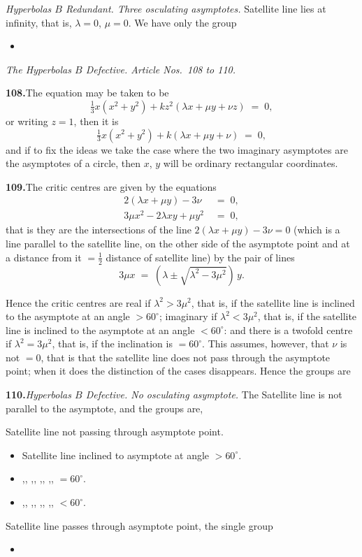 \documentclass[11pt]{article}
\begin{document}
\noindent\emph{Hyperbolas $B$ Redundant. Three osculating asymptotes.} Satellite line lies at infinity, that is, $\lambda = 0$, $\mu = 0$. We have only the group
\begin{itemize}\itemsep0pt
\item[XVII.]
\end{itemize}

\bigskip
\noindent\textit{The Hyperbolas $B$ Defective. Article Nos.~108 to 110.}

\medskip
\textbf{108.}\quad The equation may be taken to be
\[
\tfrac{1}{3} x(x^{2} + y^{2}) + k z^{2}(\lambda x + \mu y + \nu z) \;=\; 0,
\]
or writing $z = 1$, then it is
\[
\tfrac{1}{3} x(x^{2} + y^{2}) + k(\lambda x + \mu y + \nu) \;=\; 0,
\]
and if to fix the ideas we take the case where the two imaginary asymptotes are the asymptotes of a circle, then $x$, $y$ will be ordinary rectangular coordinates.

\medskip
\textbf{109.}\quad The critic centres are given by the equations
\begin{align*}
2(\lambda x + \mu y) - 3 \nu &\;=\; 0,\\
3 \mu x^{2} - 2 \lambda x y + \mu y^{2} &\;=\; 0,
\end{align*}
that is they are the intersections of the line $2(\lambda x + \mu y) - 3 \nu = 0$ (which is a line parallel to the satellite line, on the other side of the asymptote point and at a distance from it $= \tfrac{1}{2}$ distance of satellite line) by the pair of lines
\[
3 \mu x \;=\; (\lambda \pm \sqrt{\lambda^{2} - 3 \mu^{2}})\, y.
\]

Hence the critic centres are real if $\lambda^{2} > 3 \mu^{2}$, that is, if the satellite line is inclined to the asymptote at an angle $> 60^{\circ}$; imaginary if $\lambda^{2} < 3 \mu^{2}$, that is, if the satellite line is inclined to the asymptote at an angle $< 60^{\circ}$: and there is a twofold centre if $\lambda^{2} = 3 \mu^{2}$, that is, if the inclination is $= 60^{\circ}$. This assumes, however, that $\nu$ is not $= 0$, that is that the satellite line does not pass through the asymptote point; when it does the distinction of the cases disappears. Hence the groups are

\medskip
\textbf{110.}\quad \emph{Hyperbolas $B$ Defective. No osculating asymptote.} The Satellite line is not parallel to the asymptote, and the groups are,
\smallskip

\noindent Satellite line not passing through asymptote point.
\begin{itemize}\itemsep0pt
\item[XXIV.] Satellite line inclined to asymptote at angle $> 60^{\circ}$.
\item[XXV.] ,, ,, ,, ,, $= 60^{\circ}$.
\item[XXVI.] ,, ,, ,, ,, $< 60^{\circ}$.
\end{itemize}
Satellite line passes through asymptote point, the single group
\begin{itemize}\itemsep0pt
\item[XXVII.]
\end{itemize}
\end{document}
